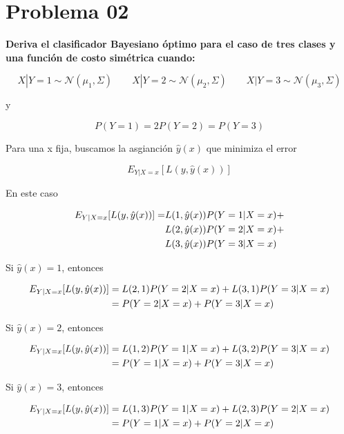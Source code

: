 \section*{Problema 02}

\textbf{Deriva el clasificador Bayesiano óptimo para el caso de tres clases y una función de costo simétrica cuando:}

\begin{equation*}
    X|Y=1 \sim \mathcal{N}(\mu_1,\Sigma)\qquad X|Y=2 \sim \mathcal{N}(\mu_2,\Sigma)\qquad X|Y=3 \sim \mathcal{N}(\mu_3,\Sigma)
\end{equation*}

y

\begin{equation*}
    P(Y=1)=2P(Y=2)=P(Y=3)
\end{equation*}

Para una x fija, buscamos la asgianción $\hat{y}(x)$ que minimiza el error

\begin{equation*}
    E_{Y|X=x} [L(y,\hat{y}(x))]
\end{equation*}

En este caso

\begin{align*}
    E_{Y|X=x} [L(y,\hat{y}(x))] = & L(1,\hat{y}(x))P(Y=1|X=x) + \\
                                  & L(2,\hat{y}(x))P(Y=2|X=x) + \\
                                  & L(3,\hat{y}(x))P(Y=3|X=x)
\end{align*}

Si $\hat{y}(x)=1$, entonces

\begin{align*}
    E_{Y|X=x} [L(y,\hat{y}(x))] & =  L(2 ,1)P(Y=2|X=x) + L(3,1)P(Y=3|X=x) \\
                                & = P(Y=2|X=x) + P(Y=3|X=x)
\end{align*}

Si $\hat{y}(x)=2$, entonces

\begin{align*}
    E_{Y|X=x} [L(y,\hat{y}(x))] & =  L(1 ,2)P(Y=1|X=x) + L(3,2)P(Y=3|X=x) \\
                                & = P(Y=1|X=x) + P(Y=3|X=x)
\end{align*}

Si $\hat{y}(x)=3$, entonces

\begin{align*}
    E_{Y|X=x} [L(y,\hat{y}(x))] & =  L(1 ,3)P(Y=1|X=x) + L(2,3)P(Y=2|X=x) \\
                                & = P(Y=1|X=x) + P(Y=2|X=x)
\end{align*}

